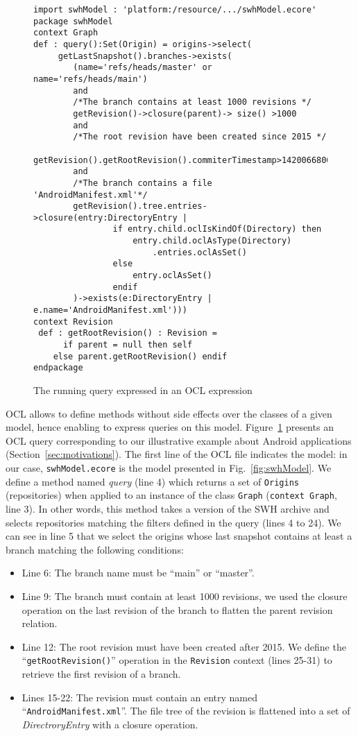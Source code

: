 \begin{figure}[ht]
\begin{lstlisting}
import swhModel : 'platform:/resource/.../swhModel.ecore'
package swhModel
context Graph
def : query():Set(Origin) = origins->select(
	 getLastSnapshot().branches->exists(
	 	(name='refs/heads/master' or name='refs/heads/main')
		and
		/*The branch contains at least 1000 revisions */
		getRevision()->closure(parent)-> size() >1000
		and
		/*The root revision have been created since 2015 */
		getRevision().getRootRevision().commiterTimestamp>1420066800
		and
		/*The branch contains a file 'AndroidManifest.xml'*/
		getRevision().tree.entries->closure(entry:DirectoryEntry |
				if entry.child.oclIsKindOf(Directory) then
					entry.child.oclAsType(Directory)
                        .entries.oclAsSet()
				else 
					entry.oclAsSet()
				endif	
		)->exists(e:DirectoryEntry | e.name='AndroidManifest.xml')))
context Revision
 def : getRootRevision() : Revision =
	  if parent = null then self
    else parent.getRootRevision() endif
endpackage

\end{lstlisting}
\caption{The running query expressed in an OCL expression}
\label{fig:OCL_query}
\end{figure}
 
OCL allows to define methods without side effects over the classes of a given model, hence enabling to express queries on this model.
Figure~\ref{fig:OCL_query} presents an OCL query corresponding to our illustrative example about Android applications (Section~\ref{sec:motivations}).
The first line of the OCL file indicates the model: in our case, \texttt{swhModel.ecore} is the model presented in Fig.~\ref{fig:swhModel}.
We define a method named \textit{query} (line 4) which returns a set of \texttt{Origins} (repositories) when applied to an instance of the class \texttt{Graph} (\texttt{context Graph}, line 3).
In other words, this method takes a version of the SWH archive and selects repositories matching the filters defined in the query (lines 4 to 24).
We can see in line 5 that we select the origins whose last snapshot contains at least a branch matching the following conditions:
  \begin{itemize}
      \item Line 6: The branch name must be ``main'' or ``master''.
      \item Line 9: The branch must contain at least 1000 revisions, we used the closure operation on the last revision of the branch to flatten the parent revision relation. 
      \item Line 12: The root revision must have been created after 2015. We define the ``\texttt{getRootRevision()}'' operation in the \texttt{Revision} context (lines 25-31) to retrieve the first revision of a branch.
      \item Lines 15-22: The revision must contain an entry named \\``\texttt{AndroidManifest.xml}''. The file tree of the revision is flattened into a set of \textit{DirectroryEntry} with a closure operation.
  \end{itemize}

